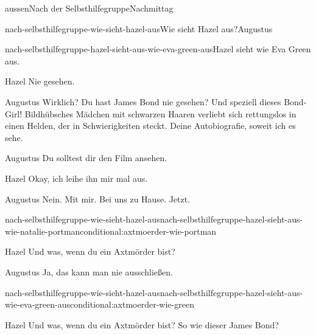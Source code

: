 \documentclass[12pt]{article}
\begin{document}
\begin{scene}[cut to]{aussen}{Nach der Selbsthilfegruppe}{Nachmittag}
\begin{decision}{nach-selbsthilfegruppe-wie-sieht-hazel-aus}{Wie sieht \gls{Hazel} aus?}{\gls{Augustus}}
\begin{option}{nach-selbsthilfegruppe-hazel-sieht-aus-wie-eva-green-aus}{\gls{Hazel} sieht wie Eva Green aus.}
                \begin{dialog}{Hazel}
                    Nie gesehen.
                \end{dialog}

                \begin{dialog}{Augustus}
                    Wirklich?
                    Du hast James Bond nie gesehen?
                    Und speziell dieses Bond-Girl!
                    Bildhübsches Mädchen mit schwarzen Haaren verliebt sich rettungslos in einen Helden, der in Schwierigkeiten steckt.
                    Deine Autobiografie, soweit ich es sehe.
                \end{dialog}
            \end{option}
        \end{decision}

        \begin{dialog}{Augustus}
            Du solltest dir den Film ansehen.
        \end{dialog}

        \begin{dialog}{Hazel}
            Okay, ich leihe ihn mir mal aus.
        \end{dialog}

        \begin{dialog}{Augustus}
            Nein.
            Mit mir.
            Bei uns zu Hause.
            Jetzt.
        \end{dialog}

        \begin{conditional}{nach-selbsthilfegruppe-wie-sieht-hazel-aus}{nach-selbsthilfegruppe-hazel-sieht-aus-wie-natalie-portman}{conditional:axtmoerder-wie-portman}
            \begin{dialog}{Hazel}
                Und was, wenn du ein Axtmörder bist?
            \end{dialog}

            \begin{dialog}{Augustus}
                Ja, das kann man nie ausschließen.
            \end{dialog}
        \end{conditional}

        \begin{conditional}{nach-selbsthilfegruppe-wie-sieht-hazel-aus}{nach-selbsthilfegruppe-hazel-sieht-aus-wie-eva-green-aus}{conditional:axtmoerder-wie-green}
            \begin{dialog}{Hazel}
                Und was, wenn du ein Axtmörder bist?
                So wie dieser James Bond?
            \end{dialog}


\end{conditional}
\end{scene}
\end{document}
